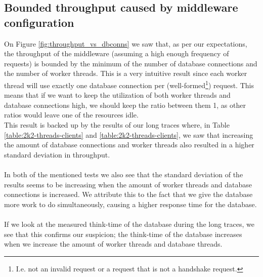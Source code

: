 \documentclass{article}
\begin{document}
        \subsection{Bounded throughput caused by middleware configuration}
            \label{sec:analysis_bound_on_throughput}
            On Figure \ref{fig:throughput_vs_dbconns} we saw that, as per our expectations, the throughput of the middleware (assuming a high enough frequency of requests) is bounded by the minimum of the number of database connections and the number of worker threads. This is a very intuitive result since each worker thread will use exactly one database connection per (well-formed\footnote{I.e. not an invalid request or a request that is not a handshake request.}) request. This means that if we want to keep the utilization of both worker threads and database connections high, we should keep the ratio between them 1, as other ratios would leave one of the resources idle.\\
            This result is backed up by the results of our long traces where, in Table \ref{table:2k2-threads-clients} and \ref{table:2k2-threads-clients}, we saw that increasing the amount of database connections and worker threads also resulted in a higher standard deviation in throughput.\\
            \\
            In both of the mentioned tests we also see that the standard deviation of the results seems to be increasing when the amount of worker threads and database connections is increased. We attribute this to the fact that we give the database more work to do simultaneously, causing a higher response time for the database.\\
            \\
            If we look at the measured think-time of the database during the long traces, we see that this confirms our suspicion; the think-time of the database increases when we increase the amount of worker threads and database threads.
\end{document}
